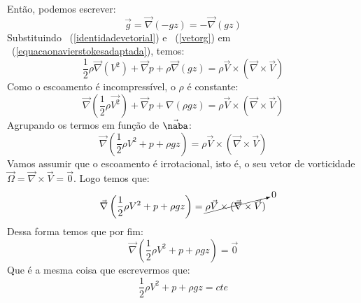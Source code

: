 \documentclass[12pt,a4paper]{article}
\begin{document}
Então, podemos escrever:
\begin{equation}
    \vec{g} = \vec{\nabla}(-gz) = -\vec{\nabla}(gz)
    \label{vetorg}
\end{equation}
Substituindo ~(\ref{identidadevetorial}) e ~(\ref{vetorg}) em ~(\ref{equacaonavierstokesadaptada}), temos:
\begin{equation}
    \frac{1}{2}\rho\vec{\nabla}(V^{2}) + \vec{\nabla}p + \rho\vec{\nabla}(gz) = \rho\vec{V} \times (\vec{\nabla} \times \vec{V})
\end{equation}
Como o escoamento é incompressível, o $\rho$ é constante:
\begin{equation}
    \vec{\nabla}\left(\frac{1}{2}\rho\vec{V^{2}}\right) + \vec{\nabla}p + \nabla(\rho gz) = \rho\vec{V} \times (\vec{\nabla} \times \vec{V})
\end{equation}
Agrupando os termos em função de $\vec{\naba}$:
\begin{equation}
    \vec{\nabla}\left(\frac{1}{2}\rho{V^{2}} + p + \rho gz\right) = \rho\vec{V} \times (\vec{\nabla} \times \vec{V})
\end{equation}
Vamos assumir que o escoamento é irrotacional, isto é, o seu vetor de vorticidade $\vec{\Omega} = \vec{\nabla} \times \vec{V} = \vec{0}$. Logo temos que:
\begin{equation}
    \vec{\nabla}\left(\frac{1}{2}\rho{V^{2}} + p + \rho gz\right) = \cancelto{0}{\rho\vec{V} \times (\vec{\nabla} \times \vec{V})}
\end{equation}
Dessa forma temos que por fim:
\begin{equation}
    \vec{\nabla}\left(\frac{1}{2}\rho{V^{2}} + p + \rho gz\right) = \vec{0}
\end{equation}
Que é a mesma coisa que escrevermos que:
\begin{equation}
    \frac{1}{2}\rho{V^{2}} + p + \rho gz = cte
\end{equation}
\end{document}
